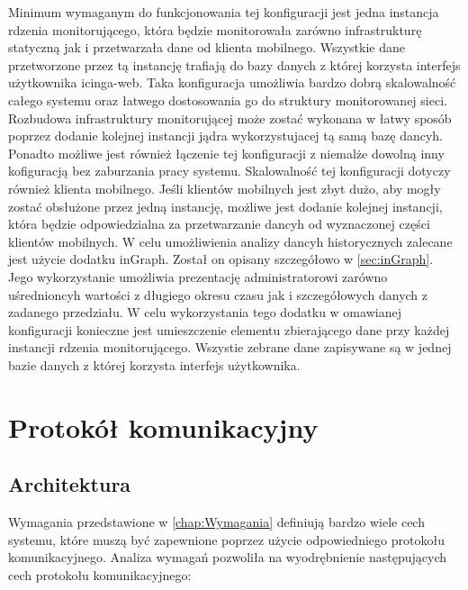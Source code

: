 Minimum wymaganym do funkcjonowania tej konfiguracji jest jedna
instancja rdzenia monitorującego, która będzie monitorowała zarówno
infrastrukturę statyczną jak i przetwarzała dane od klienta
mobilnego. Wszystkie dane przetworzone przez tą instancję trafiają do
bazy danych z której korzysta interfejs użytkownika icinga-web. Taka
konfiguracja umożliwia bardzo dobrą skalowalność całego systemu oraz
łatwego dostosowania go do struktury monitorowanej sieci. Rozbudowa
infrastruktury monitorującej może zostać wykonana w łatwy sposób
poprzez dodanie kolejnej instancji jądra wykorzystujacej tą samą bazę
dancyh. Ponadto możliwe jest również łączenie tej konfiguracji z
niemalże dowolną inny kofiguracją bez zaburzania pracy
systemu. Skalowalność tej konfiguracji dotyczy również klienta
mobilnego. Jeśli klientów mobilnych jest zbyt dużo, aby mogły zostać
obsłużone przez jedną instancję, możliwe jest dodanie kolejnej
instancji, która będzie odpowiedzialna za przetwarzanie dancyh od
wyznaczonej części klientów mobilnych. W celu umożliwienia analizy
dancyh historycznych zalecane jest użycie dodatku inGraph. Został on
opisany szczegółowo w \ref{sec:inGraph}. Jego wykorzystanie umożliwia
prezentację administratorowi zarówno uśrednioncyh wartości z długiego
okresu czasu jak i szczegółowych danych z zadanego przedziału. W celu
wykorzystania tego dodatku w omawianej konfiguracji konieczne jest
umieszczenie elementu zbierającego dane przy każdej instancji rdzenia
monitorującego. Wszystie zebrane dane zapisywane są w jednej bazie
danych z której korzysta interfejs użytkownika.



\section[Protokół komunikacyjny][Protokół komunikacyjny]{Protokół komunikacyjny}

\subsection[Architektura][Architektura]{Architektura}

Wymagania przedstawione w \ref{chap:Wymagania} definiują bardzo wiele
cech systemu, które muszą być zapewnione poprzez użycie odpowiedniego
protokołu komunikacyjnego. Analiza wymagań pozwoliła na wyodrębnienie
następujących cech protokołu komunikacyjnego:

